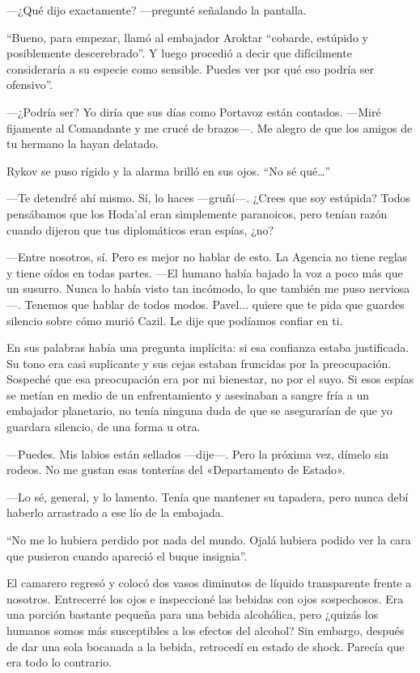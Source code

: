 —¿Qué dijo exactamente? —pregunté señalando la pantalla.

``Bueno, para empezar, llamó al embajador Aroktar ``cobarde, estúpido y posiblemente descerebrado''. Y luego procedió a decir que difícilmente consideraría a su especie como sensible. Puedes ver por qué eso podría ser ofensivo''.

—¿Podría ser? Yo diría que sus días como Portavoz están contados. —Miré fijamente al Comandante y me crucé de brazos—. Me alegro de que los amigos de tu hermano la hayan delatado.

Rykov se puso rígido y la alarma brilló en sus ojos. ``No sé qué…''

—Te detendré ahí mismo. Sí, lo haces —gruñí—. ¿Crees que soy estúpida? Todos pensábamos que los Hoda'al eran simplemente paranoicos, pero tenían razón cuando dijeron que tus diplomáticos eran espías, ¿no?

—Entre nosotros, sí. Pero es mejor no hablar de esto. La Agencia no tiene reglas y tiene oídos en todas partes. —El humano había bajado la voz a poco más que un susurro. Nunca lo había visto tan incómodo, lo que también me puso nerviosa—. Tenemos que hablar de todos modos. Pavel... quiere que te pida que guardes silencio sobre cómo murió Cazil. Le dije que podíamos confiar en ti.

En sus palabras había una pregunta implícita: si esa confianza estaba justificada. Su tono era casi suplicante y sus cejas estaban fruncidas por la preocupación. Sospeché que esa preocupación era por mi bienestar, no por el suyo. Si esos espías se metían en medio de un enfrentamiento y asesinaban a sangre fría a un embajador planetario, no tenía ninguna duda de que se asegurarían de que yo guardara silencio, de una forma u otra.

—Puedes. Mis labios están sellados —dije—. Pero la próxima vez, dímelo sin rodeos. No me gustan esas tonterías del «Departamento de Estado».

—Lo sé, general, y lo lamento. Tenía que mantener su tapadera, pero nunca debí haberlo arrastrado a ese lío de la embajada.

``No me lo hubiera perdido por nada del mundo. Ojalá hubiera podido ver la cara que pusieron cuando apareció el buque insignia''.

El camarero regresó y colocó dos vasos diminutos de líquido transparente frente a nosotros. Entrecerré los ojos e inspeccioné las bebidas con ojos sospechosos. Era una porción bastante pequeña para una bebida alcohólica, pero ¿quizás los humanos somos más susceptibles a los efectos del alcohol? Sin embargo, después de dar una sola bocanada a la bebida, retrocedí en estado de shock. Parecía que era todo lo contrario.


